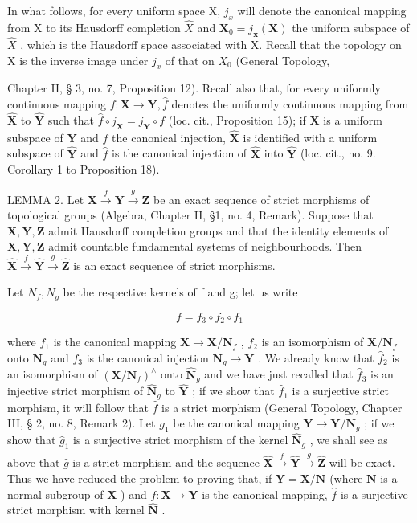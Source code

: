 In what follows, for every uniform space X, \(j_{x}\) will denote the canonical mapping from X to its Hausdorff completion \(\hat{X}\) and \(\mathbf{X}_{0}=j_{\mathbf{x}}(\mathbf{X})\) the uniform subspace of \(\hat{X}\) , which is the Hausdorff space associated with X. Recall that the topology on X is the inverse image under \(j_{x}\) of that on \(X_{0}\) (General Topology,

Chapter II, § 3, no. 7, Proposition 12). Recall also that, for every uniformly continuous mapping \(f\colon\mathbf{X}\to\mathbf{Y},\hat{f}\) denotes the uniformly continuous mapping from \(\hat{\mathbf{X}}\) to \(\hat{\mathbf{Y}}\) such that \(\hat{f}\circ j_{\mathbf{X}}=j_{\mathbf{Y}}\circ f\) (loc. cit., Proposition 15); if \(\mathbf{X}\) is a uniform subspace of \(\mathbf{Y}\) and \(f\) the canonical injection, \(\hat{\mathbf{X}}\) is identified with a uniform subspace of \(\hat{\mathbf{Y}}\) and \(\hat{f}\) is the canonical injection of \(\hat{\mathbf{X}}\) into \(\hat{\mathbf{Y}}\) (loc. cit., no. 9. Corollary 1 to Proposition 18).

LEMMA 2. Let \(\mathbf{X} \xrightarrow{f} \mathbf{Y} \xrightarrow{g} \mathbf{Z}\) be an exact sequence of strict morphisms of topological groups (Algebra, Chapter II, §1, no. 4, Remark). Suppose that \(\mathbf{X}, \mathbf{Y}, \mathbf{Z}\) admit Hausdorff completion groups and that the identity elements of \(\mathbf{X}, \mathbf{Y}, \mathbf{Z}\) admit countable fundamental systems of neighbourhoods. Then \(\hat{\mathbf{X}} \xrightarrow{f} \hat{\mathbf{Y}} \xrightarrow{g} \hat{\mathbf{Z}}\) is an exact sequence of strict morphisms.

Let \(N_{f}, N_{g}\) be the respective kernels of f and g; let us write

\[
f = f _ {3} \circ f _ {2} \circ f _ {1}
\]

where \(f_1\) is the canonical mapping \(\mathbf{X} \to \mathbf{X} / \mathbf{N}_f\) , \(f_2\) is an isomorphism of \(\mathbf{X} / \mathbf{N}_f\) onto \(\mathbf{N}_g\) and \(f_3\) is the canonical injection \(\mathbf{N}_g \to \mathbf{Y}\) . We already know that \(\hat{f}_2\) is an isomorphism of \((\mathbf{X} / \mathbf{N}_f)^{\wedge}\) onto \(\hat{\mathbf{N}}_g\) and we have just recalled that \(\hat{f}_3\) is an injective strict morphism of \(\hat{\mathbf{N}}_g\) to \(\hat{\mathbf{Y}}\) ; if we show that \(\hat{f}_1\) is a surjective strict morphism, it will follow that \(\hat{f}\) is a strict morphism (General Topology, Chapter III, § 2, no. 8, Remark 2). Let \(g_1\) be the canonical mapping \(\mathbf{Y} \to \mathbf{Y} / \mathbf{N}_g\) ; if we show that \(\hat{g}_1\) is a surjective strict morphism of the kernel \(\hat{\mathbf{N}}_g\) , we shall see as above that \(\hat{g}\) is a strict morphism and the sequence \(\hat{\mathbf{X}}\xrightarrow{f}\hat{\mathbf{Y}}\xrightarrow{\hat{g}}\hat{\mathbf{Z}}\) will be exact. Thus we have reduced the problem to proving that, if \(\mathbf{Y}=\mathbf{X}/\mathbf{N}\) (where \(\mathbf{N}\) is a normal subgroup of \(\mathbf{X}\) ) and \(f\colon\mathbf{X}\to\mathbf{Y}\) is the canonical mapping, \(\hat{f}\) is a surjective strict morphism with kernel \(\hat{\mathbf{N}}\) .

